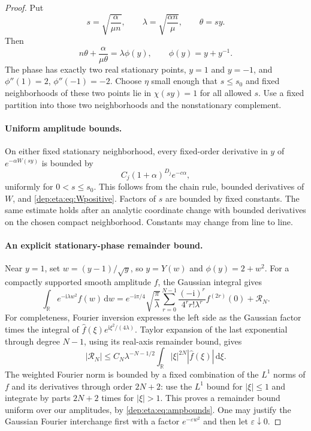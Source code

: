 \documentclass[11pt]{article}
\theoremstyle{definition}\newtheorem{definition}[theorem]{Definition}
\theoremstyle{remark}\newtheorem{remark}[theorem]{Remark}
\newcommand{\ii}{\mathrm i}
\newcommand{\dd}{\,\mathrm d}
\begin{document}
\begin{proof}
Put
\begin{equation}\label{dep:eta:eq:scaling}
 s=\sqrt{\frac\alpha{\mu n}},\qquad
 \lambda=\sqrt{\frac{\alpha n}{\mu}},\qquad \theta=sy.
\end{equation}
Then
\[
 n\theta+\frac\alpha{\mu\theta}
       =\lambda\phi(y),\qquad \phi(y)=y+y^{-1}.
\]
The phase has exactly two real stationary points, $y=1$ and $y=-1$,
and $\phi''(1)=2$, $\phi''(-1)=-2$. Choose $\eta$ small enough
that $s\le s_0$ and fixed neighborhoods of these two points lie in
$\chi(sy)=1$ for all allowed $s$. Use a fixed partition into those
two neighborhoods and the nonstationary complement.

\paragraph{Uniform amplitude bounds.}
On either fixed stationary neighborhood, every fixed-order derivative
in $y$ of $e^{-\alpha W(sy)}$ is bounded by
\begin{equation}\label{dep:eta:eq:ampbounds}
 C_j(1+\alpha)^{D_j}e^{-c\alpha},
\end{equation}
uniformly for $0<s\le s_0$. This follows from the chain rule, bounded
derivatives of $W$, and \eqref{dep:eta:eq:Wpositive}. Factors of $s$ are
bounded by fixed constants. The same estimate holds after an analytic
coordinate change with bounded derivatives on the chosen compact
neighborhood. Constants may change from line to line.

\paragraph{An explicit stationary-phase remainder bound.}
Near $y=1$, set $w=(y-1)/\sqrt y$, so $y=Y(w)$ and
$\phi(y)=2+w^2$. For a compactly supported smooth amplitude $f$, the
Gaussian integral gives
\begin{equation}\label{dep:eta:eq:gaussian}
 \int_{\mathbb R}e^{-\ii\lambda w^2}f(w)\dd w
 =e^{-\ii\pi/4}\sqrt{\frac\pi\lambda}
    \sum_{r=0}^{N-1}\frac{(-\ii)^r}{4^rr!\lambda^r}f^{(2r)}(0)
   +\mathcal R_N.
\end{equation}
For completeness, Fourier inversion expresses the left side as the
Gaussian factor times the integral of
$\widehat f(\xi)e^{\ii\xi^2/(4\lambda)}$. Taylor expansion of the
last exponential through degree $N-1$, using its real-axis remainder
bound, gives
\begin{equation}\label{dep:eta:eq:gaussianbound}
 |\mathcal R_N|\le C_N\lambda^{-N-1/2}
             \int_{\mathbb R}|\xi|^{2N}|\widehat f(\xi)|\dd\xi.
\end{equation}
The weighted Fourier norm is bounded by a fixed combination of the
$L^1$ norms of $f$ and its derivatives through order $2N+2$: use the
$L^1$ bound for $|\xi|\le1$ and integrate by parts $2N+2$ times
for $|\xi|>1$. This proves a remainder bound uniform over our
amplitudes, by \eqref{dep:eta:eq:ampbounds}. One may justify the Gaussian
Fourier interchange first with a factor $e^{-\varepsilon w^2}$ and
then let $\varepsilon\downarrow0$.


\end{proof}
\end{document}
